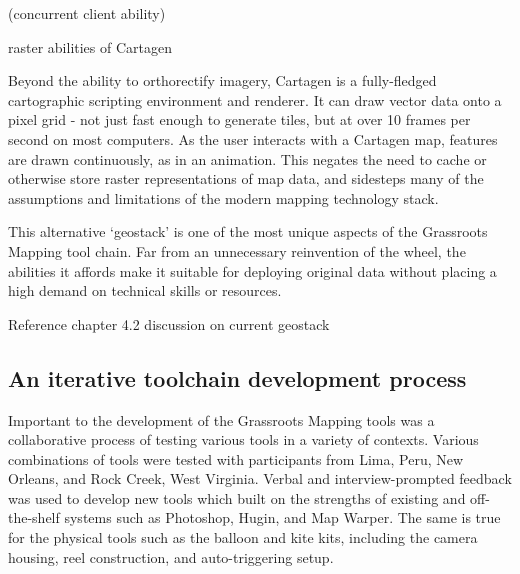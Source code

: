 \documentclass[11pt]{report}
\begin{document}
(concurrent client ability)

raster abilities of Cartagen

Beyond the ability to orthorectify imagery, Cartagen is a fully-fledged cartographic scripting environment and renderer. It can draw vector data onto a pixel grid - not just fast enough to generate tiles, but at over 10 frames per second on most computers. As the user interacts with a Cartagen map, features are drawn continuously, as in an animation. This negates the need to cache or otherwise store raster representations of map data, and sidesteps many of the assumptions and limitations of the modern mapping technology stack.

This alternative `geostack' is one of the most unique aspects of the Grassroots Mapping tool chain. Far from an unnecessary reinvention of the wheel, the abilities it affords make it suitable for deploying original data without placing a high demand on technical skills or resources. 

Reference chapter 4.2 discussion on current geostack 


\subsection{An iterative toolchain development process}

Important to the development of the Grassroots Mapping tools was a collaborative process of testing various tools in a variety of contexts. Various combinations of tools were tested with participants from Lima, Peru, New Orleans, and Rock Creek, West Virginia. Verbal and interview-prompted feedback was used to develop new tools which built on the strengths of existing and off-the-shelf systems such as Photoshop, Hugin, and Map Warper. The same is true for the physical tools such as the balloon and kite kits, including the camera housing, reel construction, and auto-triggering setup. 
\end{document}
